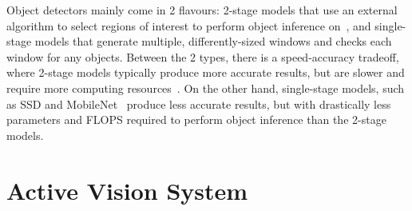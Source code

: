 \documentclass[runningheads]{llncs}
\begin{document}
Object detectors mainly come in 2 flavours: 2-stage models that use an external algorithm to select regions of interest to perform object inference on~\cite{ren2015faster}, and single-stage models that generate multiple, differently-sized windows and checks each window for any objects.
Between the 2 types, there is a speed-accuracy tradeoff, where 2-stage models typically produce more accurate results, but are slower and require more computing resources~\cite{liu2018deeplf}.
On the other hand, single-stage models, such as SSD and MobileNet~\cite{liu2016ssd,howard2017mobilenet} produce less accurate results, but with drastically less parameters and FLOPS required to perform object inference than the 2-stage models. 

\section{Active Vision System}\label{sec:active-vision}

\end{document}
